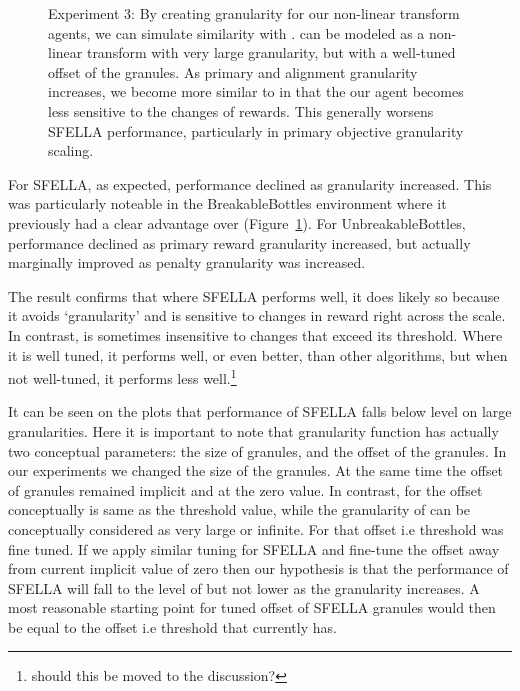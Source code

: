 \begin{figure}
  \caption{Experiment 3: By creating granularity for our non-linear transform agents, we can simulate similarity with \tloA{}. \tloA{} can be modeled as a non-linear transform with very large granularity, but with a well-tuned offset of the granules. As primary and alignment granularity increases, we become more similar to \tloA{} in that the our agent becomes less sensitive to the changes of rewards. This generally worsens SFELLA performance, particularly in primary objective granularity scaling.
  }
   \label{fig:exp3_main}

 \end{figure}
 
For SFELLA, as expected, \RStar{} performance declined as granularity increased. This was particularly noteable in the BreakableBottles environment where it previously had a clear advantage over \tloA{} (Figure~\ref{fig:exp3_main}). For UnbreakableBottles, performance declined as primary reward granularity increased, but actually marginally improved as penalty granularity was increased.%

The result confirms that where SFELLA performs well, it does likely so because it avoids `granularity' and is sensitive to changes in reward right across the scale. In contrast, \tloA{} is sometimes insensitive to changes that exceed its threshold. Where it is well tuned, it performs well, or even better, than other algorithms, but when not well-tuned, it performs less well.\footnote{should this be moved to the discussion?}

It can be seen on the plots that performance of SFELLA falls below \tloA{} level on large granularities. Here it is important to note that granularity function has actually two conceptual parameters: the size of granules, and the offset of the granules. In our experiments we changed the size of the granules. At the same time the offset of granules remained implicit and at the zero value. In contrast, for \tloA{} the offset conceptually is same as the threshold value, while the granularity of \tloA{} can be conceptually considered as very large or infinite. For \tloA{} that offset i.e threshold was fine tuned. If we apply similar tuning for SFELLA and fine-tune the offset away from current implicit value of zero then our hypothesis is that the performance of SFELLA will fall to the level of \tloA{} but not lower as the granularity increases. A most reasonable starting point for tuned offset of SFELLA granules would then be equal to the offset i.e threshold that \tloA{} currently has.





